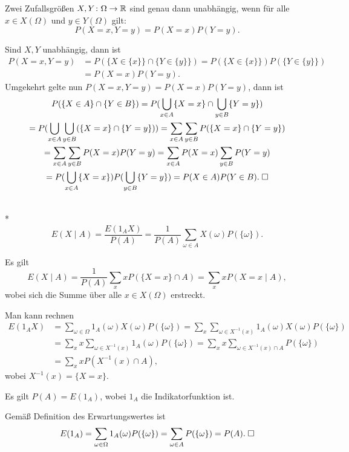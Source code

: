 \begin{Satz}
Zwei Zufallsgrößen $X,Y\colon\Omega\to\mathbb R$ sind genau dann unabhängig,
wenn für alle $x\in X(\Omega)$ und $y\in Y(\Omega)$ gilt:
\[P(X=x,Y=y)= P(X=x)P(Y=y).\]
\end{Satz}
 Sind $X,Y$ unabhängig, dann ist
\begin{align*}
P(X=x,Y=y) &= P(\{X\in\{x\}\}\cap\{Y\in\{y\}\})
= P(\{X\in\{x\}\})P(\{Y\in\{y\}\})\\
&= P(X=x)P(Y=y).
\end{align*}
Umgekehrt gelte nun $P(X=x,Y=y)=P(X=x)P(Y=y)$, dann ist
\begin{gather*}
P(\{X\in A\}\cap\{Y\in B\})
= P(\bigcup_{x\in A}\{X=x\}\cap\bigcup_{y\in B}\{Y=y\})\\
= P(\bigcup_{x\in A}\bigcup_{y\in B}(\{X=x\}\cap\{Y=y\}))
= \sum_{x\in A}\sum_{y\in B}P(\{X=x\}\cap\{Y=y\})\\
= \sum_{x\in A}\sum_{y\in B}P(X=x)P(Y=y)
= \sum_{x\in A}P(X=x)\sum_{y\in B}P(Y=y)\\
= P(\bigcup_{x\in A}\{X=x\})P(\bigcup_{y\in B}\{Y=y\})
= P(X\in A)P(Y\in B).\;\square
\end{gather*}

\begin{Definition}%
\label{def:cond-expected-value}\mbox{}\\*
\[E(X\mid A) = \frac{E(1_A X)}{P(A)} = \frac{1}{P(A)}\sum_{\omega\in A} X(\omega)P(\{\omega\}).\]
\end{Definition}

\begin{Satz} Es gilt
\[E(X\mid A) = \frac{1}{P(A)}\sum_x xP(\{X=x\}\cap A)
= \sum_x xP(X=x\mid A),\]
wobei sich die Summe über alle $x\in X(\Omega)$ erstreckt.
\end{Satz}
 Man kann rechnen
\begin{align*}
E(1_A X) &= \sum_{\omega\in\Omega} 1_A(\omega) X(\omega) P(\{\omega\})
= \sum_x\sum_{\omega\in X^{-1}(x)} 1_A(\omega) X(\omega) P(\{\omega\})\\
&= \sum_x x\sum_{\omega\in X^{-1}(x)} 1_A(\omega) P(\{\omega\})
= \sum_x x\sum_{\omega\in X^{-1}(x)\cap A} P(\{\omega\})\\
&= \sum_x x P(X^{-1}(x)\cap A),
\end{align*}
wobei $X^{-1}(x) = \{X=x\}$.\;\qedsymbol

\begin{Korollar}\label{prob-as-expected-value}
Es gilt $P(A) = E(1_A)$, wobei $1_A$ die Indikatorfunktion ist.
\end{Korollar}
 Gemäß Definition des Erwartungswertes ist
\[E(1_A) = \sum_{\omega\in\Omega} 1_A(\omega)P(\{\omega\})
= \sum_{\omega\in A}P(\{\omega\}) = P(A).\;\square\]

